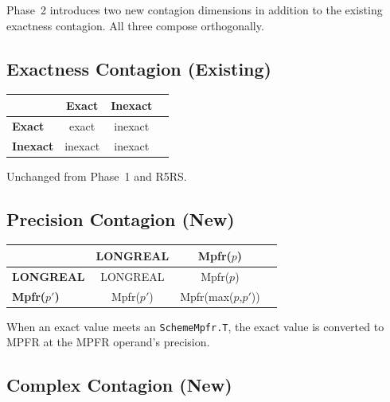 \documentclass[12pt]{article}
\begin{document}
Phase~2 introduces two new contagion dimensions in addition to
the existing exactness contagion.  All three compose orthogonally.

\subsection{Exactness Contagion (Existing)}

\begin{center}
\begin{tabular}{lccc}
\toprule
& \textbf{Exact} & \textbf{Inexact} \\
\midrule
\textbf{Exact}   & exact   & inexact \\
\textbf{Inexact} & inexact & inexact \\
\bottomrule
\end{tabular}
\end{center}

\noindent Unchanged from Phase~1 and R5RS.

\subsection{Precision Contagion (New)}

\begin{center}
\begin{tabular}{lccc}
\toprule
& \textbf{LONGREAL} & \textbf{Mpfr($p$)} \\
\midrule
\textbf{LONGREAL}   & LONGREAL   & Mpfr($p$) \\
\textbf{Mpfr($p'$)} & Mpfr($p'$) & Mpfr(max($p$,$p'$)) \\
\bottomrule
\end{tabular}
\end{center}

\noindent When an exact value meets an {\tt SchemeMpfr.T}, the
exact value is converted to MPFR at the MPFR operand's precision.

\subsection{Complex Contagion (New)}
\end{document}
